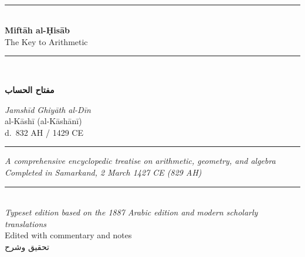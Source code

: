 \documentclass[11pt,a4paper]{article}
\newenvironment{arabicbox}{%
  \begin{framed}
  \begin{minipage}{\linewidth-2\fboxsep-2\fboxrule}
  \setlength{\parindent}{0pt}
  \linespread{1.3}\selectfont
}{%
  \end{minipage}
  \end{framed}
}
\newcommand{\longline}{\noindent\rule{\textwidth}{0.4pt}}
\newcommand{\shortline}{\noindent\rule{0.5\textwidth}{0.4pt}\par}
\newcommand{\ar}[1]{{\arabicfont\beginR #1\endR}}
\begin{document}
\thispagestyle{empty}
\begin{center}
\vspace*{1.5cm}

{\fontsize{14}{16}\selectfont\ar{بسم الله الرحمن الرحيم}}\\[0.8cm]

{\color{rulecolor}\longline}\\[0.6cm]

{\fontsize{28}{34}\selectfont\bfseries\color{titlecolor}
Mift\=ah al-\d{H}is\=ab}\\[0.5cm]
{\fontsize{18}{22}\selectfont\color{sectioncolor}
The Key to Arithmetic}\\[0.3cm]
{\color{rulecolor}\longline}\\[1cm]

\begin{arabicbox}
\begin{center}
\begin{Arabic}
{\Large\textbf{مفتاح الحساب}}
\end{Arabic}
\end{center}
\end{arabicbox}

\vspace{0.8cm}

{\Large\textit{Jamsh\=id Ghiy\=ath al-D\=in}}\\[0.3cm]
{\large al-K\=ash\=i (al-K\=ash\=an\=i)}\\[0.2cm]
{\normalsize d.\ 832 AH / 1429 CE}\\[1cm]

{\color{rulecolor}\shortline}

\vspace{0.5cm}

{\small\textit{A comprehensive encyclopedic treatise on arithmetic, geometry, and algebra}}\\[0.2cm]
{\small\textit{Completed in Samarkand, 2 March 1427 CE (829 AH)}}\\[0.5cm]

{\color{rulecolor}\longline}\\[1cm]

{\small\textit{Typeset edition based on the 1887 Arabic edition and modern scholarly translations}}\\[0.3cm]
{\small Edited with commentary and notes}\\[1cm]

{\footnotesize\ar{تحقيق وشرح}}\\[0.2cm]
\end{center}
\clearpage
\end{document}
